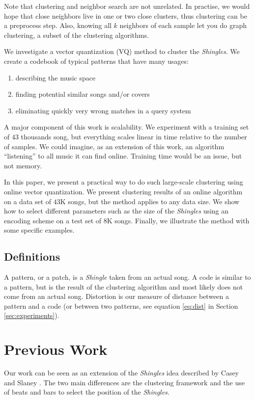 \documentclass{article}
\begin{document}
Note that clustering and neighbor search are not unrelated.
In practise, we would hope that close neighbors live in one or two
close clusters, thus clustering can be a preprocess step. Also,
knowing all $k$ neighbors of each sample let you do graph clustering,
a subset of the clustering algorithms.

We investigate a vector quantization \cite{Datar2004} (VQ) method to
cluster the \textit{Shingles}. We create a codebook of typical patterns
that have many usages:
\begin{enumerate}
\item describing the music space
\item finding potential similar songs and/or covers
\item eliminating quickly very wrong matches in a query system
\end{enumerate}


A major component of this work is scalability. We experiment with a training
set of $43$ thousands song, but everything scales linear in time
relative to the number of samples. We could imagine, as an extension
of this work, an algorithm ``listening'' to all music it can find online.
Training time would be an issue, but not memory.


In this paper, we present a practical way to do such large-scale 
clustering using online vector quantization. We present clustering results 
of an online algorithm on a data set of $43$K songs, but the method applies 
to any data size. We show how to select different parameters such as the size 
of the \textit{Shingles} using an encoding scheme on a test set of $8$K songs. 
Finally, we illustrate the method with some specific examples.



\subsection{Definitions}
A pattern, or a patch, is a \textit{Shingle} taken from an actual song.
A code is similar to a pattern, but is the result of the clustering
algorithm and most likely does not come from an actual song.
Distortion is our measure of distance between a pattern and a code
(or between two patterns, see equation \ref{eq:dist} in Section 
\ref{sec:experiments}).


\section{Previous Work}\label{sec:prevwork}
Our work can be seen as an extension of the \textit{Shingles} idea
described by Casey and Slaney \cite{Casey2006,Casey2007,Casey2008}.
The two main differences are the clustering framework and the use of
beats and bars to select the position of the \textit{Shingles}.
\end{document}
